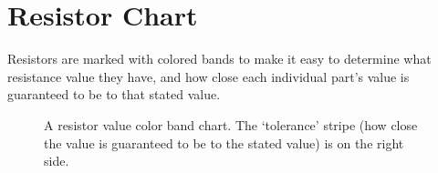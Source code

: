 \clearpage
\newpage
\section*{Resistor Chart}

Resistors are marked with colored bands to make it easy to determine what 
resistance value they have, and how close each individual part's value is 
guaranteed to be to that stated value.


\begin{figure}[!ht]
\begin{center}
\caption{A resistor value color band chart. The `tolerance' stripe (how close the value is guaranteed to be to the stated value) is on the right side. }
\label{fig:resistorchart}
\end{center}
\end{figure}

